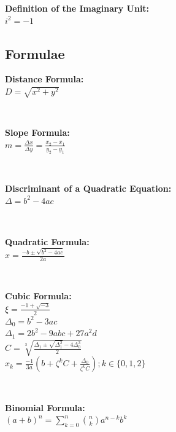 
\begin{minipage}{\textwidth}
    \textbf{Definition of the Imaginary Unit:}
    \\ \( i^2 = -1 \)
\end{minipage}

\subsection*{Formulae}
\begin{minipage}{\textwidth}
    \textbf{Distance Formula:}
    \\ \( D = \sqrt{ x^2 + y^2 } \)
\end{minipage}
\\ \begin{minipage}{\textwidth}
    \textbf{Slope Formula:}
    \\ \( m = \displaystyle\frac{ \Delta x }{ \Delta y } = \displaystyle\frac{ x_2 - x_1 }{ y_2 - y_1 } \)
\end{minipage}
\\ \begin{minipage}{\textwidth}
    \textbf{Discriminant of a Quadratic Equation:}
    \\ \( \Delta = b^2 - 4ac \)
\end{minipage}
\\ \begin{minipage}{\textwidth}
    \textbf{Quadratic Formula:}
    \\ \( x = \displaystyle\frac{ -b \pm \sqrt{ b^2 - 4ac } }{ 2a } \)
\end{minipage}
\\ \begin{minipage}{\textwidth}
    \textbf{Cubic Formula:}
    \\ \( \xi = \displaystyle\frac{ -1 + \sqrt{ -3 } }{ 2 } \)
    \\ \( \Delta_0 = b^2 - 3ac  \)
    \\ \( \Delta_1 = 2b^2 - 9abc + 27 a^2 d \)
    \\ \( C = \sqrt[3]{ \displaystyle\frac{ \Delta_1 \pm \sqrt{ \Delta_1^2 } -4 \Delta_0^3 }{ 2 } } \)
    \\ \( x_k = \displaystyle\frac{ -1 }{ 3a } \left(  b + \zeta^kC + \displaystyle\frac{ \Delta_0 }{ \zeta^k C } \right) ; k \in \{ 0, 1, 2 \} \)
\end{minipage}
\\ \begin{minipage}{\textwidth}
    \textbf{Binomial Formula:}
    \\ \( ( a + b )^n = \displaystyle\sum_{k = 0}^{n} { \binom{n}{k} a^{n - k} b^k } \)
\end{minipage}

